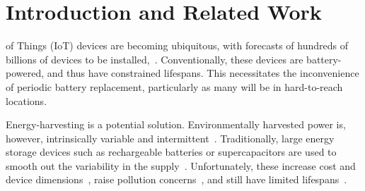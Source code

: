 
\section{Introduction and Related Work} \label{section:intro}


 of Things (IoT) devices are becoming ubiquitous, with forecasts of hundreds of billions of devices to be installed,~\cite{7954016, sundmaeker2010vision, dave2011next}.
Conventionally, these devices are battery-powered, and thus have constrained lifespans. This necessitates the inconvenience of periodic battery replacement, particularly as many will be in hard-to-reach locations.  

Energy-harvesting is a potential solution. Environmentally harvested power is, however, intrinsically variable and intermittent~\cite{4494336}. Traditionally, large energy storage devices such as rechargeable batteries or supercapacitors are used to smooth out the variability in the supply~\cite{5522465, Kansal:2007:PME:1274858.1274870, Buchli:2014:DPM:2668332.2668333, Wagemann:2017:OER:3136518.3078631, Jiang:2005:PEP:1147685.1147765, Simjee:2006:ELS:1165573.1165619}. Unfortunately, these increase cost and device dimensions~\cite{4494753}, raise pollution concerns~\cite{LIU2014210}, and still have limited lifespans~\cite{AKHTAR2015769, 4494753}. 

